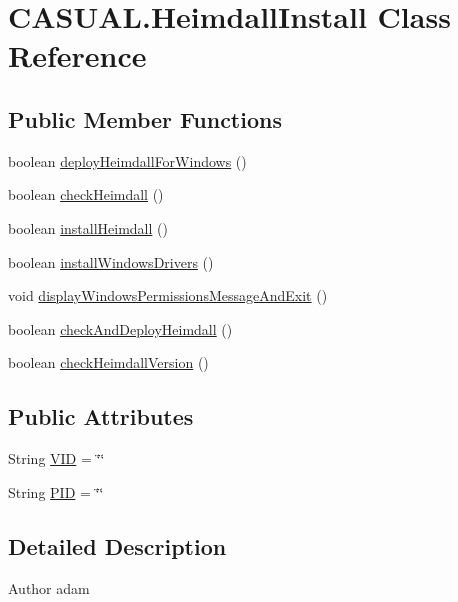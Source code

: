 \hypertarget{classCASUAL_1_1HeimdallInstall}{\section{C\-A\-S\-U\-A\-L.\-Heimdall\-Install Class Reference}
\label{classCASUAL_1_1HeimdallInstall}
}
\subsection*{Public Member Functions}
\begin{DoxyCompactItemize}
\item 
boolean \hyperlink{classCASUAL_1_1HeimdallInstall_a50633964b1eb9ae286cfaae3d1d288dd}{deploy\-Heimdall\-For\-Windows} ()
\item 
boolean \hyperlink{classCASUAL_1_1HeimdallInstall_aeed58a2f098e237d8532b553824f813d}{check\-Heimdall} ()
\item 
boolean \hyperlink{classCASUAL_1_1HeimdallInstall_a932c3a701a6dd740d2a4171cb3802544}{install\-Heimdall} ()
\item 
boolean \hyperlink{classCASUAL_1_1HeimdallInstall_aaa85ff3b6f6ddf52850fe791db21da15}{install\-Windows\-Drivers} ()
\item 
void \hyperlink{classCASUAL_1_1HeimdallInstall_aa884481a876d8d67c8b48c1252efaae4}{display\-Windows\-Permissions\-Message\-And\-Exit} ()
\item 
boolean \hyperlink{classCASUAL_1_1HeimdallInstall_a7d0022c631eef27a410a08f33b989e1a}{check\-And\-Deploy\-Heimdall} ()
\item 
boolean \hyperlink{classCASUAL_1_1HeimdallInstall_a706906189ba536381bc49d78f5702a25}{check\-Heimdall\-Version} ()
\end{DoxyCompactItemize}
\subsection*{Public Attributes}
\begin{DoxyCompactItemize}
\item 
String \hyperlink{classCASUAL_1_1HeimdallInstall_a5203df5605f1c468861edbacd3cc174d}{V\-I\-D} = \char`\"{}\char`\"{}
\item 
String \hyperlink{classCASUAL_1_1HeimdallInstall_ac8b2b370a75b48ad9efea5740aad4418}{P\-I\-D} = \char`\"{}\char`\"{}
\end{DoxyCompactItemize}


\subsection{Detailed Description}
\begin{DoxyAuthor}{Author}
adam 
\end{DoxyAuthor}


